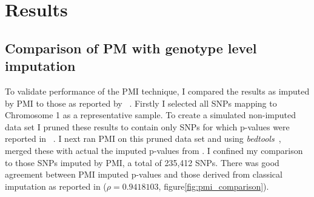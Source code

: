 \documentclass[a4paper,11pt]{report}
\begin{document}



\chapter{Results}

\section{Comparison of PM with genotype level imputation}

To validate performance of the PMI technique, I compared the results as imputed by PMI to those as reported by  ~\citep{Okada2014-um}.  Firstly I selected all SNPs mapping to Chromosome 1 as a representative sample. To create a simulated non-imputed data set I pruned these results to contain only SNPs for which p-values were reported in ~\citep{Stahl2010-wz}. I next ran PMI on this pruned data set and using \textit{bedtools}~\citep{Quinlan2014}, merged these with actual the imputed p-values from \nocite{Okada2014-um}. I confined my comparison to those SNPs imputed by PMI, a total of 235,412 SNPs. There was good agreement between PMI imputed p-values and those derived from classical imputation as reported in \cite*{Okada2014-um} ($\rho=0.9418103$, figure\ref{fig:pmi_comparison}). %
\end{document}
